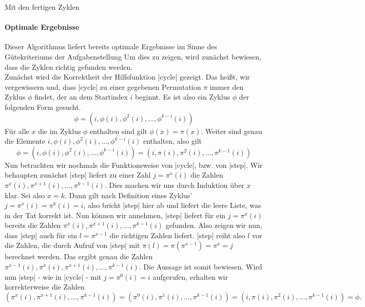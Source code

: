 Mit den fertigen Zyklen

\paragraph{Optimale Ergebnisse}
\label{opt_res}
Dieser Algorithmus liefert bereits optimale Ergebnisse im Sinne des Gütekriteriums der Aufgabenstellung
Um dies zu zeigen, wird zunächst bewiesen, dass die Zyklen richtig gefunden werden. \\

Zunächst wird die Korrektheit der Hilfsfunktion |cycle| gezeigt.
Das heißt, wir vergewissern und, dass |cycle| zu einer gegebenen Permutation $\pi$ immer den Zyklus $\phi$ findet, der an dem Startindex $i$ beginnt.
Es ist also ein Zyklus $\phi$ der folgenden Form gesucht.
\[ \phi = (i, \phi(i),\phi^2(i), \dots, \phi^{k-i}(i)) \]
Für alle $x$ die im Zyklus $\phi$ enthalten sind gilt $\phi(x) = \pi(x)$.
Weiter sind genau die Elemente $i, \phi(i),\phi^2(i), \dots, \phi^{k-i}(i)$ enthalten, also gilt
\[ \phi = (i, \phi(i),\phi^2(i), \dots, \phi^{k-i}(i)) = (i, \pi(i),\pi^2(i), \dots, \pi^{k-1}(i)) \]
Nun betrachten wir nochmals die Funktionsweise von |cycle|, bzw. von |step|.
Wir behaupten zunächst |step| liefert zu einer Zahl $j = \pi^x(i)$ die Zahlen $\pi^x(i), \pi^{x+1}(i), \dots, \pi^{k-1}(i)$.
Dies machen wir uns durch Induktion über $x$ klar. Sei also $x = k$.
Dann gilt nach Definition eines Zyklus' $j = \pi^x(i) = \pi^k(i) = i$, also bricht |step| hier ab und liefert die leere Liste, was in der Tat korrekt ist.
Nun können wir annehmen, |step| liefert für ein $j = \pi^x(i)$ bereits die Zahlen $\pi^x(i), \pi^{x+1}(i), \dots, \pi^{k-1}(i)$ gefunden.
Also zeigen wir nun, dass |step| auch für ein $l = \pi^{x-1}$ die richtigen Zahlen liefert.
|step| reiht also $l$ vor die Zahlen, die durch Aufruf von |step| mit $\pi(l) = \pi(\pi^{x-1}) = \pi^x = j$ berechnet werden.
Das ergibt genau die Zahlen $\pi^{x-1}(i), \pi^x(i), \pi^{x+1}(i), \dots, \pi^{k-1}(i)$.
Die Aussage ist somit bewiesen.
Wird nun |step| - wie in |cycle| - mit $j = \pi^0(i) = i$ aufgerufen, erhalten wir korrekterweise die Zahlen
\[ (\pi^x(i), \pi^{x+1}(i), \dots, \pi^{k-1}(i)) = (\pi^0(i), \pi^1(i), \dots, \pi^{k-1}(i)) = (i, \pi(i), \pi^2(i), \dots, \pi^{k-1}(i)) = \phi.\]

